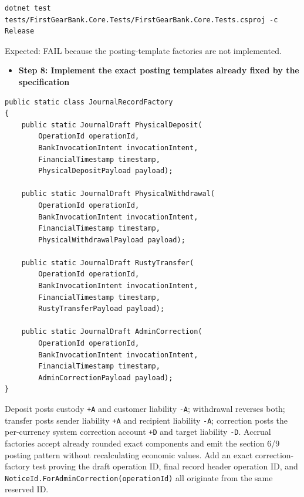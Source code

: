 \documentclass[
  10pt,
  letterpaper,
]{article}
\newcommand{\passthrough}[1]{#1}
\providecommand{\tightlist}{%
  \setlength{\itemsep}{0pt}\setlength{\parskip}{0pt}}
\begin{document}
\begin{lstlisting}
dotnet test tests/FirstGearBank.Core.Tests/FirstGearBank.Core.Tests.csproj -c Release
\end{lstlisting}

Expected: FAIL because the posting-template factories are not
implemented.

\begin{itemize}
\tightlist
\item[$\square$]
  \textbf{Step 8: Implement the exact posting templates already fixed by
  the specification}
\end{itemize}

\begin{lstlisting}
public static class JournalRecordFactory
{
    public static JournalDraft PhysicalDeposit(
        OperationId operationId,
        BankInvocationIntent invocationIntent,
        FinancialTimestamp timestamp,
        PhysicalDepositPayload payload);

    public static JournalDraft PhysicalWithdrawal(
        OperationId operationId,
        BankInvocationIntent invocationIntent,
        FinancialTimestamp timestamp,
        PhysicalWithdrawalPayload payload);

    public static JournalDraft RustyTransfer(
        OperationId operationId,
        BankInvocationIntent invocationIntent,
        FinancialTimestamp timestamp,
        RustyTransferPayload payload);

    public static JournalDraft AdminCorrection(
        OperationId operationId,
        BankInvocationIntent invocationIntent,
        FinancialTimestamp timestamp,
        AdminCorrectionPayload payload);
}
\end{lstlisting}

Deposit posts custody \passthrough{\lstinline!+A!} and customer
liability \passthrough{\lstinline!-A!}; withdrawal reverses both;
transfer posts sender liability \passthrough{\lstinline!+A!} and
recipient liability \passthrough{\lstinline!-A!}; correction posts the
per-currency system correction account \passthrough{\lstinline!+D!} and
target liability \passthrough{\lstinline!-D!}. Accrual factories accept
already rounded exact components and emit the section 6/9 posting
pattern without recalculating economic values. Add an exact
correction-factory test proving the draft operation ID, final record
header operation ID, and
\texttt{NoticeId.}\allowbreak{}\texttt{ForAdminCorrection(}\allowbreak{}\texttt{operationId)}\allowbreak{}
all originate from the same reserved ID.
\end{document}
